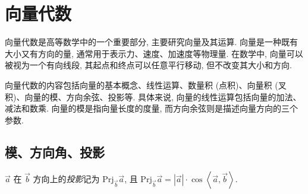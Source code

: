 \section{向量代数}

向量代数是高等数学中的一个重要部分, 主要研究向量及其运算. 向量是一种既有大小又有方向的量, 通常用于表示力、速度、加速度等物理量. 在数学中, 向量可以被视为一个有向线段, 其起点和终点可以任意平行移动, 但不改变其大小和方向.

向量代数的内容包括向量的基本概念、线性运算、数量积 (点积)、向量积 (叉积)、向量的模、方向余弦、投影等. 具体来说, 向量的线性运算包括向量的加法、减法和数乘. 向量的模是指向量长度的度量, 而方向余弦则是描述向量方向的三个参数.

\subsection{模、方向角、投影}

\begin{definition}[投影]
    $\vec{a}$ 在 $\vec{b}$ 方向上的\textit{投影}记为 $\mathrm{Prj}_{\vec{b} } \vec{a}$,
    且 $\mathrm{Prj}_{\vec{b} } \vec{a}=|\vec{a}| \cdot \cos\left \langle \vec{a},\vec{b} \right \rangle .$
\end{definition}

